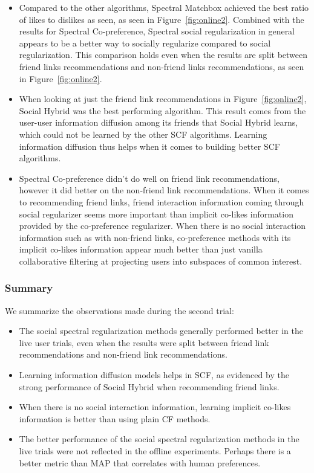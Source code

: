 \begin{itemize}
\item{Compared to the other algorithms, Spectral Matchbox achieved the
best ratio of likes to dislikes as seen, as seen in
Figure~\ref{fig:online2}. Combined with the results for Spectral
Co-preference, Spectral social regularization in general appears to be
a better way to socially regularize compared to social
regularization. This comparison holds even when the results are split
between friend links recommendations and non-friend links
recommendations, as seen in Figure~\ref{fig:online2}.}

\item{When looking at just the friend link recommendations in
Figure~\ref{fig:online2}, Social Hybrid was the best performing
algorithm. This result comes from the user-user information diffusion
among its friends that Social Hybrid learns, which could not be
learned by the other SCF algorithms. Learning information diffusion
thus helps when it comes to building better SCF algorithms.}

\item{Spectral Co-preference didn't do well on friend link
recommendations, however it did better on the non-friend link
recommendations. When it comes to recommending friend links, friend
interaction information coming through social regularizer seems more
important than implicit co-likes information provided by the
co-preference regularizer. When there is no social interaction
information such as with non-friend links, co-preference methods with
its implicit co-likes information appear much better than just vanilla
collaborative filtering at projecting users into subspaces of common
interest.}
\end{itemize}

\subsubsection{Summary}

We summarize the observations made during the second trial:

\begin{itemize}
\item{The social spectral regularization methods generally performed
better in the live user trials, even when the results were split
between friend link recommendations and non-friend link
recommendations.}

\item{Learning information diffusion models helps in SCF, as evidenced
by the strong performance of Social Hybrid when recommending friend
links.}

\item{When there is no social interaction information, learning
implicit co-likes information is better than using plain CF methods.}

\item{The better performance of the social spectral regularization
methods in the live trials were not reflected in the offline
experiments. Perhaps there is a better metric than MAP that correlates
with human preferences.}
\end{itemize}

